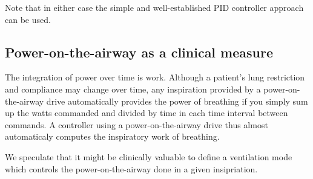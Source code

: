 \documentclass{article}
\begin{document}
Note that in either case the simple and well-established PID controller
approach can be used.

\subsection{Power-on-the-airway as a clinical measure}

The integration of power over time is work. Although a patient's
lung restriction and compliance may change over time, any inspiration
provided by a power-on-the-airway drive automatically provides
the power of breathing if you simply sum up the watts commanded
and divided by time in each time interval between commands.
A controller using a power-on-the-airway drive thus almost
automaticaly computes the inspiratory work of breathing.

We speculate that it might be clinically valuable to
define a ventilation mode which controls the power-on-the-airway
done in a given insipriation.





\end{document}
